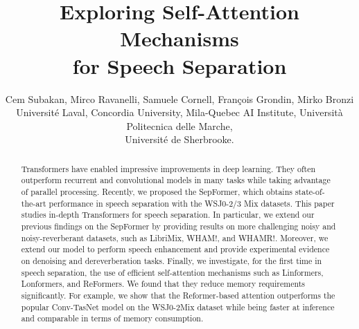 \documentclass[lettersize,journal]{IEEEtran}
\begin{document}
\title{Exploring Self-Attention Mechanisms \\for Speech Separation}



\author{Cem Subakan, Mirco Ravanelli, Samuele Cornell, Fran\c{c}ois Grondin, Mirko Bronzi \\Universit{\'e} Laval, Concordia University, Mila-Quebec AI Institute, Università Politecnica delle Marche, \\ Universit{\'e} de Sherbrooke. 
}
















\usetikzlibrary{arrows.meta}


\maketitle

\begin{abstract}
Transformers have enabled impressive improvements in deep learning. They often outperform recurrent and convolutional models in many tasks while taking advantage of parallel processing. Recently, we proposed the SepFormer, which obtains state-of-the-art performance in speech separation with the WSJ0-2/3 Mix datasets. This paper studies in-depth Transformers for speech separation. In particular, we extend our previous findings on the SepFormer by providing results on more challenging noisy and noisy-reverberant datasets, such as LibriMix, WHAM!, and WHAMR!. Moreover, we extend our model to perform speech enhancement and provide experimental evidence on denoising and dereverberation tasks. Finally, we investigate, for the first time in speech separation, the use of efficient self-attention mechanisms such as Linformers, Lonformers, and ReFormers. We found that they reduce memory requirements significantly. For example, we show that the Reformer-based attention outperforms the popular Conv-TasNet model on the WSJ0-2Mix dataset while being faster at inference and comparable in terms of memory consumption.











\end{abstract}
\end{document}
